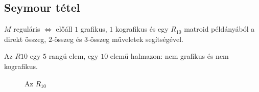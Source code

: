 \subsection{Seymour tétel}

$M$ reguláris $\Leftrightarrow$  előáll $1$ grafikus, $1$ kografikus és egy
$R_{10}$ matroid példányából a direkt összeg, $2$-összeg és $3$-összeg műveletek
segítségével.

Az $R10$ egy $5$ rangú elem, egy $10$ elemű halmazon: nem grafikus és nem
kografikus.

\begin{figure}[htb]
\caption{Az $R_{10}$}
\label{fig:Seymour}
\centering {} 
\end{figure} 